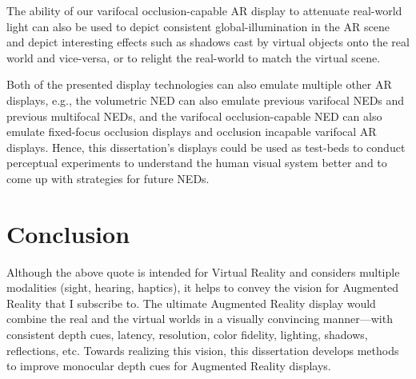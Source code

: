 The ability of our varifocal occlusion-capable AR display to attenuate real-world light can also be used to depict consistent global-illumination in the AR scene and depict interesting effects such as shadows cast by virtual objects onto the real world and vice-versa, or to relight the real-world to match the virtual scene. 

Both of the presented display technologies can also emulate multiple other AR displays, e.g., the volumetric NED can also emulate previous varifocal NEDs and previous multifocal NEDs, and the varifocal occlusion-capable NED can also emulate fixed-focus occlusion displays and occlusion incapable varifocal AR displays. 
Hence, this dissertation’s displays could be used as test-beds to conduct perceptual experiments to understand the human visual system better and to come up with strategies for future NEDs.

\section{Conclusion}


Although the above quote is intended for Virtual Reality and considers multiple modalities (sight, hearing, haptics), it helps to convey the vision for Augmented Reality that I subscribe to. 
The ultimate Augmented Reality display would combine the real and the virtual worlds in a visually convincing manner—with consistent depth cues, latency, resolution, color fidelity, lighting, shadows, reflections, etc. 
Towards realizing this vision, this dissertation develops methods to improve monocular depth cues for Augmented Reality displays. 


%